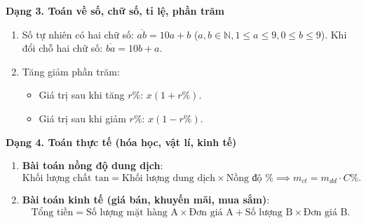 \textbf{Dạng 3. Toán về số, chữ số, tỉ lệ, phần trăm}
\begin{enumerate}
\item Số tự nhiên có hai chữ số: $\overline{ab} = 10a + b$ ($a, b \in \mathbb{N}, 1 \le a \le 9, 0 \le b \le 9$). Khi đổi chỗ hai chữ số: $\overline{ba} = 10b + a$.
\item Tăng giảm phần trăm:
\begin{itemize}
\item Giá trị sau khi tăng $r\%$: $x(1 + r\%)$.
\item Giá trị sau khi giảm $r\%$: $x(1 - r\%)$.
\end{itemize}
\end{enumerate}

\textbf{Dạng 4. Toán thực tế (hóa học, vật lí, kinh tế)}
\begin{enumerate}
\item \textbf{Bài toán nồng độ dung dịch}:
$$\text{Khối lượng chất tan} = \text{Khối lượng dung dịch} \times \text{Nồng độ \%} \implies m_{ct} = m_{dd} \cdot C\%.$$
\item \textbf{Bài toán kinh tế (giá bán, khuyến mãi, mua sắm)}:
$$\text{Tổng tiền} = \text{Số lượng mặt hàng A} \times \text{Đơn giá A} + \text{Số lượng B} \times \text{Đơn giá B}.$$
\end{enumerate}
